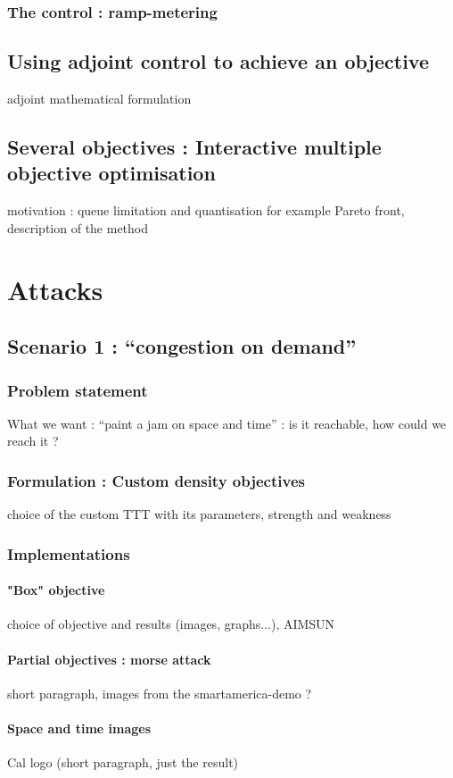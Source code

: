 \documentclass{article}
\begin{document}
		\subsubsection{The control : ramp-metering}	
	\subsection{Using adjoint control to achieve an objective}
		adjoint mathematical formulation
	\subsection{Several objectives : Interactive multiple objective optimisation}
		motivation : queue limitation and quantisation for example
		Pareto front, description of the method 
		
\section{Attacks}
	\subsection{Scenario 1 : ``congestion on demand''}
		\subsubsection{Problem statement}
			What we want : ``paint a jam on space and time'' : is it reachable, how could we reach it ?
		\subsubsection{Formulation : Custom density objectives}
			choice of the custom TTT with its parameters, strength and weakness
		\subsubsection{Implementations}
			\paragraph{"Box" objective}
				choice of objective and results (images, graphs...), AIMSUN
			\paragraph{Partial objectives : morse attack}
				short paragraph, images from the smartamerica-demo ?
			\paragraph{Space and time images}
				Cal logo (short paragraph, just the result)
\end{document}
